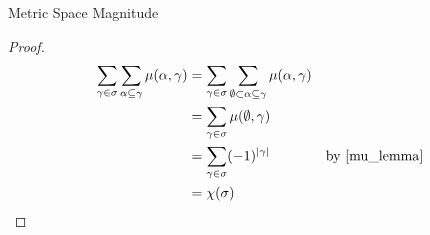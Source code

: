 \documentclass[12pt]{pom_thesis}
\begin{document}
\begin{chapter}{Metric Space Magnitude}
\begin{thm}
\end{thm}
\begin{proof}

\begin{align*}
\sum_{\gamma \in \sigma} \sum_{\alpha \subseteq \gamma} \mu(\alpha, \gamma) &= \sum_{\gamma \in \sigma} \sum_{\emptyset \subset \alpha \subseteq \gamma} \mu(\alpha, \gamma)\\
&= \sum_{\gamma \in \sigma} \mu(\emptyset, \gamma)\\
&= \sum_{\gamma \in \sigma} (-1)^{|\gamma|} &\text{by \ref{mu_lemma}}\\
&= \chi(\sigma)
\end{align*}
\end{proof}
\end{chapter}


\end{document}
